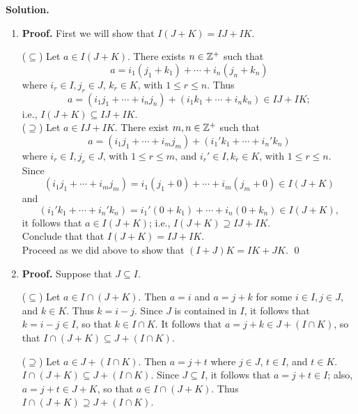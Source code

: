 \begin{enumerate}
      \textbf{Solution.}

      \begin{enumerate}
         \item \textbf{Proof.} First we will show that $I(J + K) = IJ + IK$.
   
               ($\subseteq$) Let $a \in I(J + K)$. There exists $n \in \mathbb{Z}^+$ 
               such that
               $$a = i_1(j_1 + k_1) + \cdots + i_n(j_n + k_n)$$
               where $i_r \in I, j_r \in J$, $k_r \in K$, with $1 \le r \le n$.
               Thus
               $$a = (i_1j_1 + \cdots + i_nj_n) +
                     (i_1k_1 + \cdots + i_nk_n) \in IJ + IK;$$
               i.e., $I(J + K) \subseteq IJ + IK$. \\
   
               ($\supseteq$) Let $a \in IJ + IK$. There exist $m, n \in \mathbb{Z}^+$ 
               such that
               $$a = (i_1j_1 + \cdots + i_mj_m) + (i_1'k_1 + \cdots + i_n'k_n)$$
               where $i_r \in I, j_r \in J$, with $1 \le r \le m$, and
               $i_r' \in I, k_r \in K$, with $1 \le r \le n$. Since
               $$(i_1j_1 + \cdots + i_mj_m) = i_1(j_1 + 0) +\cdots +i_m(j_m+0)
                 \in I(J + K)$$
               and
               $$(i_1'k_1 + \cdots + i_n'k_n) = i_1'(0+k_1) +\cdots +i_n(0+k_n)
                 \in I(J + K),$$
               it follows that $a \in I(J + K)$; i.e.,
               $I(J + K) \supseteq IJ + IK$. \\

               Conclude that that $I(J + K) = IJ + IK$. \\

               Proceed as we did above to show that $(I + J)K = IK + JK$. \qed
         \item \textbf{Proof.} Suppose that $J \subseteq I$. 
   
               ($\subseteq$) Let $a \in I \cap (J + K)$. Then $a = i$ and
               $a = j + k$ for some $i \in I, j \in J$, and $k \in K$. Thus
               $k = i - j$. Since $J$ is contained in $I$, it follows that
               $k = i - j \in I$, so that $k \in I \cap K$. It follows that
               $a = j + k \in J + (I \cap K)$, so that
               $I \cap (J + K) \subseteq J + (I \cap K)$.
   
               ($\supseteq$) Let $a \in J + (I \cap K)$. Then $a = j + t$ where
               $j \in J$, $t \in I$, and $t \in K$.
               $I \cap (J + K) \subseteq J + (I \cap K)$. Since $J \subseteq I$,
               it follows that $a = j + t \in I$; also, $a = j + t \in J + K$,
               so that $a \in I \cap (J + K)$. Thus
               $I \cap (J + K) \supseteq J + (I \cap K)$. \\


\end{enumerate}
\end{enumerate}
